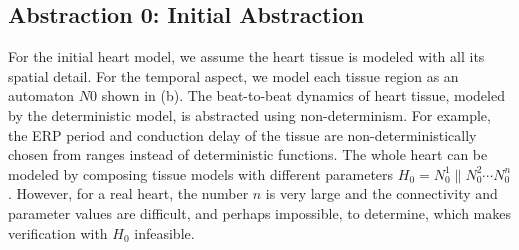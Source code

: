 \subsection{Abstraction 0: Initial Abstraction}
For the initial heart model, we assume the heart tissue is modeled with all its spatial detail. For the temporal aspect, we model each tissue region as an automaton $N0$ shown in (b). The beat-to-beat dynamics of heart tissue, modeled by the deterministic model, is abstracted using non-determinism. For example, the ERP period and conduction delay of the tissue are non-deterministically chosen from ranges instead of deterministic functions. The whole heart can be modeled by composing tissue models with different parameters $H_0=N_0^1\|N_0^2\cdots N_0^n$. However, for a real heart, the number $n$ is very large and the connectivity and parameter values are difficult, and perhaps impossible, to determine, which makes verification with $H_0$ infeasible. 
